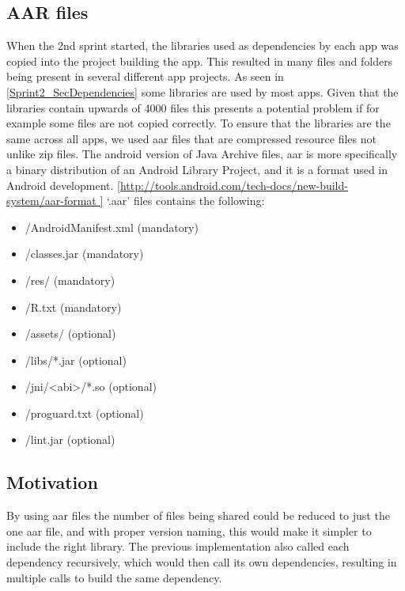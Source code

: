 \subsection{AAR files}\label{Sprint2_aarfiles}

When the 2nd sprint started, the libraries used as dependencies by each app was copied into the project building the app. This resulted in many files and folders being present in several different app projects. As seen in \ref{Sprint2_SecDependencies} some libraries are used by most apps. Given that the libraries contain upwards of 4000 files this presents a potential problem if for example some files are not copied correctly. To ensure that the libraries are the same across all apps, we used aar files that are compressed resource files not unlike zip files.
The android version of Java Archive files, aar is more specifically a binary distribution of an Android Library Project, and it is a format used in Android development. \ref{http://tools.android.com/tech-docs/new-build-system/aar-format }
‘.aar’ files contains the following:

\begin{itemize}
\item /AndroidManifest.xml (mandatory)
\item /classes.jar (mandatory)
\item /res/ (mandatory)
\item /R.txt (mandatory)
\item /assets/ (optional)
\item /libs/*.jar (optional)
\item /jni/<abi>/*.so (optional)
\item /proguard.txt (optional)
\item /lint.jar (optional)
\end{itemize}

\subsection{Motivation}
By using aar files the number of files being shared could be reduced to just the one aar file, and with proper version naming, this would make it simpler to include the right library. The previous implementation also called each dependency recursively, which would then call its own dependencies, resulting in multiple calls to build the same dependency.

